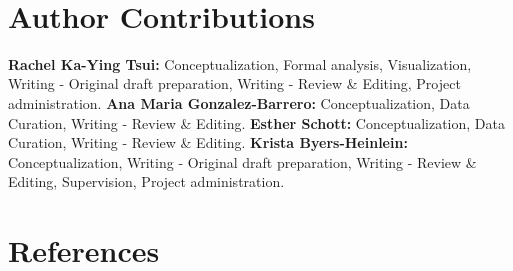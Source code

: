 \documentclass[
  english,
  ,man,floatsintext]{apa6}
\begin{document}
~
~

\hypertarget{author-contributions}{%
\section{Author Contributions}\label{author-contributions}}

\noindent \textbf{Rachel Ka-Ying Tsui:} Conceptualization, Formal analysis, Visualization, Writing - Original draft preparation, Writing - Review \& Editing, Project administration. \textbf{Ana Maria Gonzalez-Barrero:} Conceptualization, Data Curation, Writing - Review \& Editing. \textbf{Esther Schott:} Conceptualization, Data Curation, Writing - Review \& Editing. \textbf{Krista Byers-Heinlein:} Conceptualization, Writing - Original draft preparation, Writing - Review \& Editing, Supervision, Project administration.

\newpage

\hypertarget{references}{%
\section{References}\label{references}}

\begingroup
\setlength{\parindent}{-0.5in}
\end{document}
